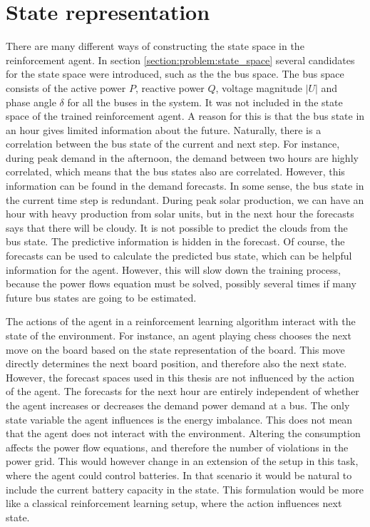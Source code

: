 \documentclass[class=book, crop=false]{standalone}
\begin{document}
\section{State representation}
There are many different ways of constructing the state space in the reinforcement agent. In section \ref{section:problem:state_space} several candidates for the state space were introduced, such as the the bus space. The bus space consists of the active power $P$, reactive power $Q$, voltage magnitude $|U|$ and phase angle $\delta$ for all the buses in the system. It was not included in the state space of the trained reinforcement agent. A reason for this is that the bus state in an hour gives limited information about the future. Naturally, there is a correlation between the bus state of the current and next step. For instance, during peak demand in the afternoon, the demand between two hours are highly correlated, which means that the bus states also are correlated. However, this information can be found in the demand forecasts. In some sense, the bus state in the current time step is redundant. During peak solar production, we can have an hour with heavy production from solar units, but in the next hour the forecasts says that there will be cloudy. It is not possible to predict the clouds from the bus state. The predictive information is hidden in the forecast. Of course, the forecasts can be used to calculate the predicted bus state, which can be helpful information for the agent. However, this will slow down the training process, because the power flows equation must be solved, possibly several times if many future bus states are going to be estimated. 

The actions of the agent in a reinforcement learning algorithm interact with the state of the environment. For instance, an agent playing chess chooses the next move on the board based on the state representation of the board. This move directly determines the next board position, and therefore also the next state. However, the forecast spaces used in this thesis are not influenced by the action of the agent. The forecasts for the next hour are entirely independent of whether the agent increases or decreases the demand power demand at a bus. The only state variable the agent influences is the energy imbalance. This does not mean that the agent does not interact with the environment. Altering the consumption affects the power flow equations, and therefore the number of violations in the power grid. 
This would however change in an extension of the setup in this task, where the agent could control batteries. In that scenario it would be natural to include the current battery capacity in the state. This formulation would be more like a classical reinforcement learning setup, where the action influences next state.
\end{document}
